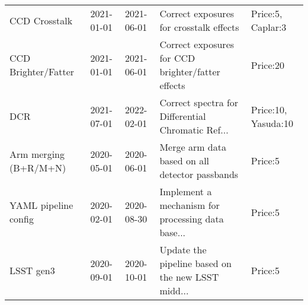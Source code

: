 \begin{longtable}{p{2cm}llp{2cm}l}
                               CCD Crosstalk &  2021-01-01 &  2021-06-01 &            Correct exposures for crosstalk effects &       Price:5, Caplar:3 \\
                         CCD Brighter/Fatter &  2021-01-01 &  2021-06-01 &  Correct exposures for CCD brighter/fatter effects &                Price:20 \\
                                         DCR &  2021-07-01 &  2022-02-01 &  Correct spectra for Differential Chromatic Ref... &     Price:10, Yasuda:10 \\
                       Arm merging (B+R/M+N) &  2020-05-01 &  2020-06-01 &     Merge arm data based on all detector passbands &                 Price:5 \\
                        YAML pipeline config &  2020-02-01 &  2020-08-30 &  Implement a mechanism for processing data base... &                 Price:5 \\
                                   LSST gen3 &  2020-09-01 &  2020-10-01 &  Update the pipeline based on the new LSST midd... &                 Price:5 \\
\end{longtable}

